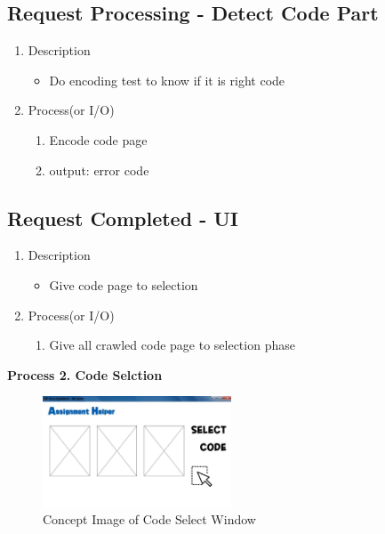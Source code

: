 \documentclass[conference]{IEEEtran}
\begin{document}
\subsection{Request Processing - Detect Code Part}
\begin{enumerate}
\item Description
  \begin{itemize}
    \item Do encoding test to know if it is right code
  \end{itemize}
  \item Process(or I/O)
  \begin{enumerate}
    \item Encode code page
    \item output: error code
  \end{enumerate}
\end{enumerate}
\textit{}


\subsection{Request Completed - UI}
\begin{enumerate}
  \item Description
  \begin{itemize}
    \item Give code page to selection
  \end{itemize}
  \item Process(or I/O)
  \begin{enumerate}
    \item Give all crawled code page to selection phase
  \end{enumerate}
\end{enumerate}

\textit{}

\textbf{Process 2. Code Selction}


\textit{}
\begin{figure}[h]
\centering
\includegraphics[width=0.5\textwidth]{./figures/UI_code_select.jpg}
\caption{Concept Image of Code Select Window}
\label{fig_concept_code_select}
\end{figure}
\end{document}

